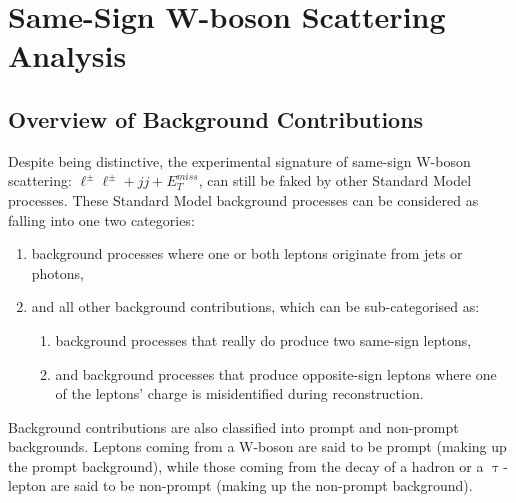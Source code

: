 \chapter{Same-Sign W-boson Scattering Analysis}
\label{ssWW_analysis}
\section{Overview of Background Contributions}
Despite being distinctive, the experimental signature of same-sign W-boson scattering: $\ell^{\pm}\ell^{\pm} + jj + E_{T}^{miss}$, can still be faked by other Standard Model processes. These Standard Model background processes can be considered as falling into one two categories:
\begin{enumerate}
\item background processes where one or both leptons originate from jets or photons,
\item and all other background contributions, which can be sub-categorised as:
	\begin{enumerate}
	\item background processes that really do produce two same-sign leptons,
	\item and background processes that produce opposite-sign leptons where one of the leptons' charge is misidentified during reconstruction.
	\end{enumerate}
\end{enumerate}
Background contributions are also classified into prompt and non-prompt backgrounds. Leptons coming from a W-boson are said to be prompt (making up the prompt background), while those coming from the decay of a hadron or a $\uptau$-lepton are said to be non-prompt (making up the non-prompt background).

